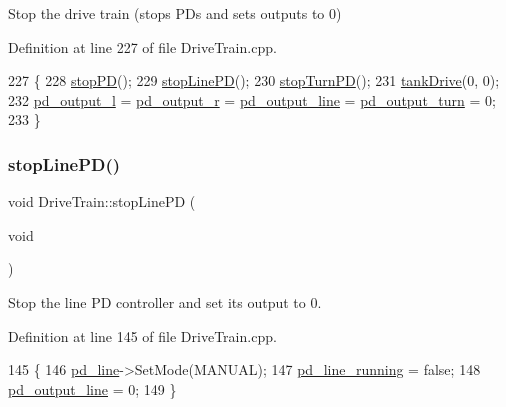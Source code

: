 Stop the drive train (stops P\+Ds and sets outputs to 0) 



Definition at line 227 of file Drive\+Train.\+cpp.


\begin{DoxyCode}
227                           \{
228     \hyperlink{class_drive_train_a597c70f11ab197d71360664981e1a2a8}{stopPD}();
229     \hyperlink{class_drive_train_a17dc5a1823a710f555ea34f0a1ad57ff}{stopLinePD}();
230     \hyperlink{class_drive_train_a74a6ee807665e54f51a1fc88284a5f04}{stopTurnPD}();
231     \hyperlink{class_drive_train_a60ef155b4f149532a2ae872edc0e2cc2}{tankDrive}(0, 0);
232     \hyperlink{class_drive_train_a53268d36c28c3ed0e70aaf69086d4953}{pd\_output\_l} = \hyperlink{class_drive_train_a4c3242a549d04b72192e5cf9e590845e}{pd\_output\_r} = \hyperlink{class_drive_train_a02595614747de0602048d8d5e9643750}{pd\_output\_line} = 
      \hyperlink{class_drive_train_a65aa0053b0648cf1fea8d0f0fc21c04e}{pd\_output\_turn} = 0;
233 \}
\end{DoxyCode}
\mbox{\label{class_drive_train_a17dc5a1823a710f555ea34f0a1ad57ff}} 
\subsubsection{\texorpdfstring{stop\+Line\+P\+D()}{stopLinePD()}}
{\footnotesize\ttfamily void Drive\+Train\+::stop\+Line\+PD (\begin{DoxyParamCaption}\item[{void}]{ }\end{DoxyParamCaption})}



Stop the line PD controller and set its output to 0. 



Definition at line 145 of file Drive\+Train.\+cpp.


\begin{DoxyCode}
145                                 \{
146     \hyperlink{class_drive_train_ae33321a75190a321ce50d884ae6e2393}{pd\_line}->SetMode(MANUAL);
147     \hyperlink{class_drive_train_aaf576007439966ed66f0d91a2121a332}{pd\_line\_running} = \textcolor{keyword}{false};
148     \hyperlink{class_drive_train_a02595614747de0602048d8d5e9643750}{pd\_output\_line} = 0;
149 \}
\end{DoxyCode}
\mbox{\label{class_drive_train_a597c70f11ab197d71360664981e1a2a8}} 
